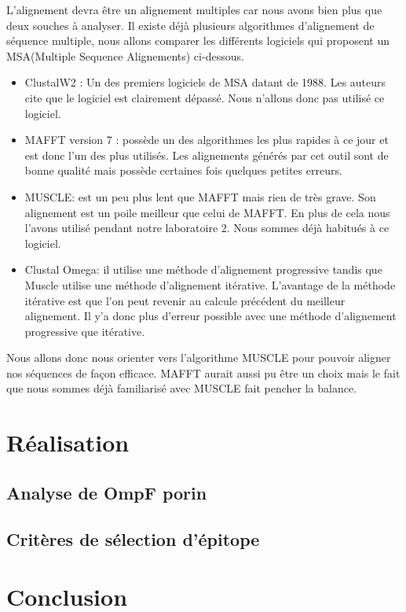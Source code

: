 \documentclass{article}
\begin{document}
 L'alignement devra être un alignement multiples car nous avons bien plus que deux souches à analyser. Il existe déjà plusieurs algorithmes d'alignement de séquence multiple, nous allons comparer les différents logiciels qui proposent un MSA(Multiple Sequence Alignements) ci-dessous.
 
 
\begin{itemize}
  \item ClustalW2 : Un des premiers logiciels de MSA datant de 1988. Les auteurs cite que le logiciel est clairement dépassé. Nous n'allons donc pas utilisé ce logiciel. 
  \item MAFFT version 7 : possède un des algorithmes les plus rapides à ce jour et est donc l'un des plus utilisés. Les alignements générés par cet outil sont de bonne qualité mais possède certaines fois quelques petites erreurs.
  
  \item MUSCLE: est un peu plus lent que MAFFT mais rien de très grave. Son alignement est un poile meilleur que celui de MAFFT. En plus de cela nous l'avons utilisé pendant notre laboratoire 2. Nous sommes déjà habitués à ce logiciel. 

	\item Clustal Omega: il utilise une méthode d'alignement progressive tandis que Muscle utilise une méthode d'alignement itérative. L'avantage de la méthode itérative est que l'on peut revenir au calcule précédent du meilleur alignement. Il y'a donc plus d'erreur possible avec une méthode d'alignement progressive que itérative.
	
\end{itemize}

Nous allons donc nous orienter vers l'algorithme MUSCLE pour pouvoir aligner nos séquences de façon efficace. MAFFT aurait aussi pu être un choix mais le fait que nous sommes déjà familiarisé avec MUSCLE fait pencher la balance. 

  \section{Réalisation}
  
    \subsection{Analyse de OmpF porin}
    
    \subsection{Critères de sélection d'épitope}
  
  \section{Conclusion}
\end{document}

